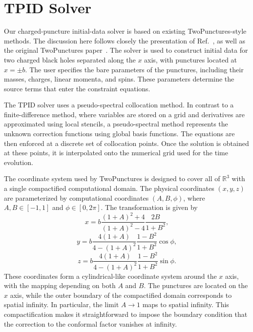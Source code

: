\section{TPID Solver}

Our charged-puncture initial-data solver is based on existing
TwoPunctures-style methods. The discussion here follows closely the
presentation of Ref.~\cite{Bozzola2019}, as well as the original
TwoPunctures paper~\cite{Ansorg2004_TwoPunctures}. The solver is used to
construct initial data for two charged black holes separated along the
$x$ axis, with punctures located at $x=\pm b$. The user specifies the
bare parameters of the punctures, including their masses, charges, linear
momenta, and spins. These parameters determine the source terms that
enter the constraint equations.

The TPID solver uses a pseudo-spectral collocation method. In contrast
to a finite-difference method, where variables are stored on a grid and
derivatives are approximated using local stencils, a pseudo-spectral
method represents the unknown correction functions using global basis
functions. The equations are then enforced at a discrete set of
collocation points. Once the solution is obtained at these points, it is
interpolated onto the numerical grid used for the time evolution.

The coordinate system used by TwoPunctures is designed to cover all of
$\mathbb{R}^3$ with a single compactified computational domain. The
physical coordinates $(x,y,z)$ are parameterized by computational
coordinates $(A,B,\phi)$, where $A,B\in[-1,1]$ and
$\phi\in[0,2\pi]$. The transformation is given by
\begin{equation}
x
=
b
\frac{(1+A)^2+4}{(1+A)^2-4}
\frac{2B}{1+B^2},
\end{equation} 
\begin{equation}
y
=
b
\frac{4(1+A)}{4-(1+A)^2}
\frac{1-B^2}{1+B^2}
\cos\phi,
\end{equation}
\begin{equation}
z
=
b
\frac{4(1+A)}{4-(1+A)^2}
\frac{1-B^2}{1+B^2}
\sin\phi .
\end{equation}
These coordinates form a cylindrical-like coordinate system around the
$x$ axis, with the mapping depending on both $A$ and $B$. The punctures
are located on the $x$ axis, while the outer boundary of the compactified
domain corresponds to spatial infinity. In particular, the limit
$A\rightarrow 1$ maps to spatial infinity. This compactification makes it
straightforward to impose the boundary condition that the correction to
the conformal factor vanishes at infinity.

